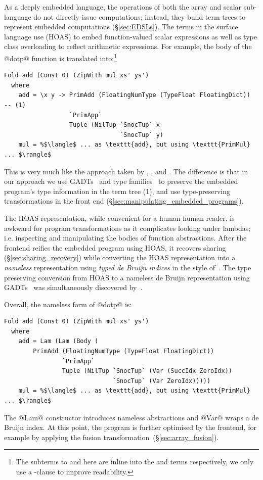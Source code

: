 As a deeply embedded language, the operations of both the array and scalar
sub-language do not directly issue computations; instead, they build term trees
to represent embedded computations (\S\ref{sec:EDSLs}). The terms in the surface
language use  (HOAS) to embed
function-valued scalar expressions as well as type class overloading to reflect
arithmetic expressions. For example, the body of the @dotp@ function
is translated into:\footnote{The subterms to  and 
here are inline into the  and  terms respectively,
we only use a -clause to improve readability.}
%
\begin{lstlisting}[style=haskell]
  Fold add (Const 0) (ZipWith mul xs' ys')
  where
    add = \x y -> PrimAdd (FloatingNumType (TypeFloat FloatingDict))               -- (1)
                  `PrimApp`
                  Tuple (NilTup `SnocTup` x
                                `SnocTup` y)
    mul = %$\langle$ ... as \texttt{add}, but using \texttt{PrimMul} ... $\rangle$
\end{lstlisting}
%
This is very much like the approach taken by \citet{Elliott:2004hh},
\citet{Gill:2011wy}, and \citet{Mainland:2010vj}. The difference is that in our
approach we use GADTs~\cite{Jones:2006eh} and type
families~\cite{Chakravarty:2005dx,Schrijvers:2008ir} to preserve the embedded
program's type information in the term tree (1), and use type-preserving
transformations in the front end (\S\ref{sec:manipulating_embedded_programs}).

The HOAS representation, while convenient for a human human reader, is awkward
for program transformations as it complicates looking under lambdas; i.e.
inspecting and manipulating the bodies of function abstractions. After the
frontend reifies the embedded program using HOAS, it recovers sharing
(\S\ref{sec:sharing_recovery}) while converting the HOAS representation into a
\emph{nameless} representation using \emph{typed de Bruijn indices} in the style
of~\citet{Altenkirch:2003kz}. The type preserving conversion from HOAS to a
nameless de Bruijn representation using GADTs~\cite{Chakravarty:2009uo} was
simultaneously discovered by~\citet{Atkey:2009dj}.

Overall, the nameless form of @dotp@ is:
%
\begin{lstlisting}[style=haskell]
  Fold add (Const 0) (ZipWith mul xs' ys')
  where
    add = Lam (Lam (Body (
        PrimAdd (FloatingNumType (TypeFloat FloatingDict))
                `PrimApp`
                Tuple (NilTup `SnocTup` (Var (SuccIdx ZeroIdx))
                              `SnocTup` (Var ZeroIdx)))))
    mul = %$\langle$ ... as \texttt{add}, but using \texttt{PrimMul} ... $\rangle$
\end{lstlisting}
%
The @Lam@ constructor introduces nameless abstractions and @Var@ wraps a de
Bruijn index. At this point, the program is further optimised by the frontend,
for example by applying the fusion transformation~(\S\ref{sec:array_fusion}).

